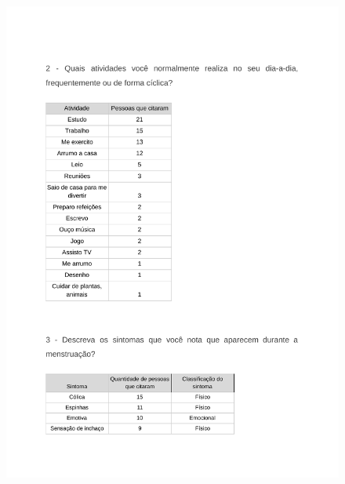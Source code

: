 \begin{apendicesenv}
        \begin{figure}[ht]
            \centering
            \includegraphics[keepaspectratio=true,scale=0.7]{figuras/Tab16.pdf}
        \end{figure}
        

\end{apendicesenv}
